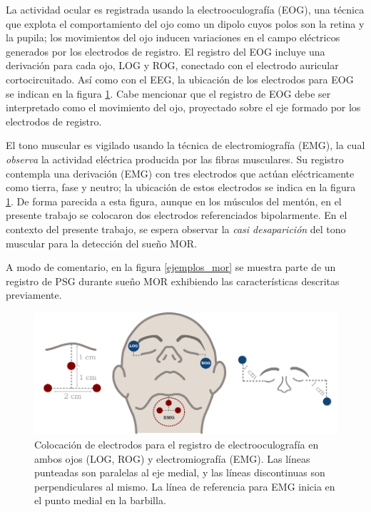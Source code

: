 \documentclass[12pt,letterpaper]{book}
\begin{document}
La actividad ocular es registrada usando la electrooculografía (EOG), una técnica que explota el comportamiento del ojo como un dipolo cuyos polos son la retina y la pupila; los movimientos del ojo inducen variaciones en el campo eléctricos generados por los electrodos de registro.
%
El registro del EOG incluye una derivación para cada ojo, LOG y ROG, conectado con el electrodo auricular cortocircuitado.
%
Así como con el EEG, la ubicación de los electrodos para EOG se indican en la figura \ref{emg_eog}.
%
Cabe mencionar que el registro de EOG debe ser interpretado como el movimiento del ojo, proyectado sobre el eje formado por los electrodos de registro.

El tono muscular es vigilado usando la técnica de electromiografía (EMG), la cual \textit{observa} la actividad eléctrica producida por las fibras musculares.
%
Su registro contempla una derivación (EMG) con tres electrodos que actúan eléctricamente como tierra, fase y neutro; la ubicación de estos electrodos se indica en la figura \ref{emg_eog}. De forma parecida a esta figura, aunque en los músculos del mentón, en el presente trabajo se colocaron dos electrodos referenciados bipolarmente.  
%
En el contexto del presente trabajo, se espera observar la \textit{casi desaparición} del tono muscular para la detección del sueño MOR.

A modo de comentario, en la figura \ref{ejemplos_mor} se muestra parte de un registro de PSG durante sueño MOR exhibiendo las características descritas previamente.

\begin{figure}
\centering
\includegraphics[width=\linewidth]
{./img_diagramas/emg_eog_v4.pdf}
\caption[Colocación de electrodos para el registro de electrooculograma y electromiograma]{Colocación de electrodos para el registro de electrooculografía en ambos ojos (LOG, ROG) y electromiografía (EMG). Las líneas punteadas son paralelas al eje medial, y las líneas discontinuas son perpendiculares al mismo. La línea de referencia para EMG inicia en el punto medial en la barbilla.}
\label{emg_eog}
\end{figure}
\end{document}
